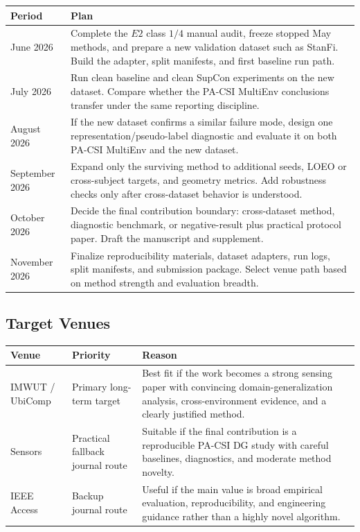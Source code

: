 \documentclass[11pt]{article}
\begin{document}
\begin{longtable}{@{}p{0.95in}p{5.35in}@{}}
\toprule
Period & Plan \\
\midrule
\endhead
June 2026 & Complete the $E2$ class $1/4$ manual audit, freeze stopped May methods, and prepare a new validation dataset such as StanFi. Build the adapter, split manifests, and first baseline run path. \\
July 2026 & Run clean baseline and clean SupCon experiments on the new dataset. Compare whether the PA-CSI MultiEnv conclusions transfer under the same reporting discipline. \\
August 2026 & If the new dataset confirms a similar failure mode, design one representation/pseudo-label diagnostic and evaluate it on both PA-CSI MultiEnv and the new dataset. \\
September 2026 & Expand only the surviving method to additional seeds, LOEO or cross-subject targets, and geometry metrics. Add robustness checks only after cross-dataset behavior is understood. \\
October 2026 & Decide the final contribution boundary: cross-dataset method, diagnostic benchmark, or negative-result plus practical protocol paper. Draft the manuscript and supplement. \\
November 2026 & Finalize reproducibility materials, dataset adapters, run logs, split manifests, and submission package. Select venue path based on method strength and evaluation breadth. \\
\bottomrule
\end{longtable}

\subsection*{Target Venues}

\begin{longtable}{@{}p{1.25in}p{1.35in}p{3.55in}@{}}
\toprule
Venue & Priority & Reason \\
\midrule
\endhead
IMWUT / UbiComp & Primary long-term target & Best fit if the work becomes a strong sensing paper with convincing domain-generalization analysis, cross-environment evidence, and a clearly justified method. \\
Sensors & Practical fallback journal route & Suitable if the final contribution is a reproducible PA-CSI DG study with careful baselines, diagnostics, and moderate method novelty. \\
IEEE Access & Backup journal route & Useful if the main value is broad empirical evaluation, reproducibility, and engineering guidance rather than a highly novel algorithm. \\
\bottomrule
\end{longtable}
\end{document}

